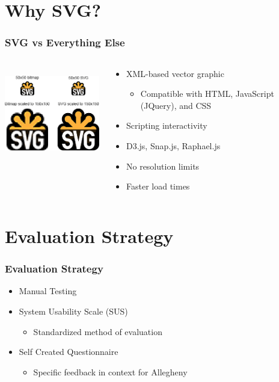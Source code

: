 \documentclass[hyperref={pdfpagelabels=false}]{beamer}
\begin{document}
\section{Why SVG?}
\hypertarget{Why SVG?}{{}}
\begin{frame}
\frametitle{SVG vs Everything Else}

\begin{columns}
	\begin{column}{.6\textwidth}
	\centering	
	\includegraphics[height=4cm,width=5cm]{svgInfo.png} 
	\end{column}
 \begin{column}{.45\textwidth}
 	 \begin{itemize}[<+->]
 	 	\item XML-based vector graphic
 	 	\begin{itemize}
 	 			\item Compatible with HTML, JavaScript (JQuery), and CSS 
 	 		\end{itemize}
 	 		\item Scripting interactivity
 	 		\item D3.js, Snap.js, Raphael.js
 	 		\item No resolution limits
 	 		\item Faster load times
 	 \end{itemize}
 \end{column}
\end{columns}
\end{frame}
\section{Evaluation Strategy} 
\hypertarget{Evaluation Strategy}{{}}
\begin{frame}
\frametitle{Evaluation Strategy}
\begin{itemize}[<+->]
	\item Manual Testing
	\item System Usability Scale (SUS)
		\begin{itemize}
			\item Standardized method of evaluation
		\end{itemize}
	\item Self Created Questionnaire
	\begin{itemize}
		\item Specific feedback in context for Allegheny
	\end{itemize}
\end{itemize}
\end{frame}
\end{document}
